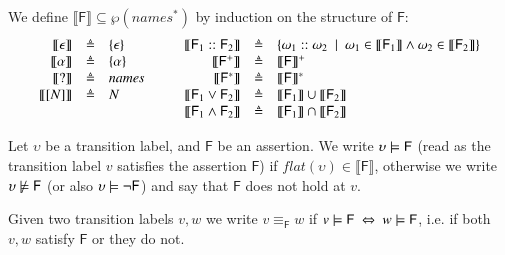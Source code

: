 \begin{definition}
 We define $\llbracket \mathsf{F}\rrbracket \subseteq\wp(\mathit{names}^*)$ by induction on the structure of $\mathsf{F}$: 
\[
\begin{array}{rcl@{\hspace{1cm}}rcl}
 \llbracket \epsilon \rrbracket &\defeq&  \{\epsilon\}
 & \llbracket \mathsf{F}_1::\mathsf{F}_2 \rrbracket &\defeq& \{\omega_1 :: \omega_2~\mid~ \omega_1 \in \llbracket \mathsf{F}_1 \rrbracket \wedge \omega_2 \in \llbracket \mathsf{F}_2 \rrbracket\}  \\
 \llbracket \alpha \rrbracket &\defeq&  \{\alpha\} 
 & \llbracket \mathsf{F}^+ \rrbracket &\defeq& \llbracket \mathsf{F} \rrbracket^+  \\
 \llbracket ? \rrbracket &\defeq&   \mathit{names}
 & \llbracket \mathsf{F}^* \rrbracket &\defeq& \llbracket \mathsf{F} \rrbracket^*  \\
 \llbracket [N]\rrbracket &\defeq&   N
 & \llbracket  \mathsf{F}_1 \vee \mathsf{F}_2 \rrbracket &\defeq& \llbracket  \mathsf{F}_1\rrbracket \cup \llbracket  \mathsf{F}_2\rrbracket  \\
 &&&\llbracket  \mathsf{F}_1 \wedge \mathsf{F}_2 \rrbracket &\defeq& \llbracket \mathsf{F}_1 \rrbracket \cap \llbracket \mathsf{F}_2\rrbracket 
\end{array}
\]
\end{definition}




\begin{definition}\label{sec:semantics}
Let  $\upsilon$ be  a transition label, and $\mathsf{F}$ be an assertion.
We write $\upsilon \models \mathsf{F}$ (read as the transition label $v$ satisfies the assertion $\mathsf{F}$) 
if $\mathit{flat}(\upsilon)\in \llbracket \mathsf{F}\rrbracket$, otherwise we write $\upsilon \not\models \mathsf{F}$ (or also $\upsilon \models \neg \mathsf{F}$) and say that $\mathsf{F}$ does not hold at $v$. 
\end{definition}

Given two transition labels $v,w$ we write $v\equiv_{\mathsf{F}} w$ if $v \models \mathsf{F}\ \Leftrightarrow\ w \models \mathsf{F}$, i.e. if both $v,w$ satisfy $\mathsf{F}$ or they do not.


